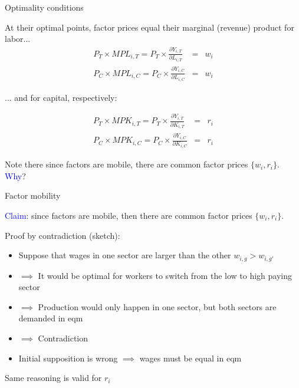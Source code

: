 \documentclass[notes,11pt, aspectratio=169, xcolor=table]{beamer}
\newcommand{\blue}[1]{\textcolor{blue}{#1}}
\newenvironment{wideitemize}{\itemize\addtolength{\itemsep}{10pt}}{\enditemize}
\begin{document}
\begin{frame}{Optimality conditions}
\begin{wideitemize}
    
        \item At their optimal points, factor prices equal their marginal (revenue) product for labor...
        \begin{eqnarray*}
            P_T \times MPL_{i,T} = P_T \times  \frac{\partial Y_{i,T}}{\partial L_{i,T}} &=& w_i\\
            P_C \times MPL_{i,C} = P_C \times  \frac{\partial Y_{i,C}}{\partial L_{i,C}} &=& w_i 
        \end{eqnarray*}

        \item<2-> ... and for capital, respectively:

                \begin{eqnarray*}
            P_T \times MPK_{i,T} =  P_T \times  \frac{\partial Y_{i,T}}{\partial K_{i,T}} &=&r_{i} \\
            P_C \times MPK_{i,C} = P_C \times  \frac{\partial Y_{i,C}}{\partial K_{i,C}} &=& r_{i}
        \end{eqnarray*}

        \item<3-> Note there since factors are mobile, there are common factor prices $\{w_i,r_i\}$. \blue{Why}?

\end{wideitemize}    
\end{frame}

\begin{frame}{Factor mobility}
\begin{wideitemize}
    
        \item \blue{Claim}: since factors are mobile, then there are common factor prices $\{w_i,r_i\}$.

        \item<2-> Proof by contradiction (sketch):
        \begin{itemize}
            \item<3-> Suppose that wages in one sector are larger than the other $w_{i,g} > w_{i,g'}$
            \item<4-> $\implies$ It would be optimal for workers to switch from the low to high paying sector
            \item<5-> $\implies$ Production would only happen in one sector, but both sectors are demanded in eqm
            \item<6-> $\implies$ Contradiction
            \item<7-> Initial supposition is wrong $\implies$ wages must be equal in eqm 
        \end{itemize}

        \item<8->  Same reasoning is valid for $r_i$

\end{wideitemize}    
\end{frame}
\end{document}

